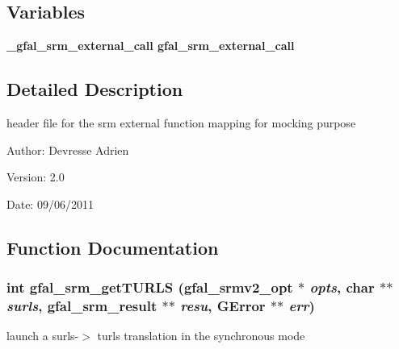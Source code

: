\subsection*{Variables}
\begin{CompactItemize}
\item 
\bf{\_\-gfal\_\-srm\_\-external\_\-call} \textbf{gfal\_\-srm\_\-external\_\-call}\label{gfal__common__srm__internal__layer_8h_67b12c7342043451fc5ce31b1a3d74fb}

\end{CompactItemize}


\subsection{Detailed Description}
header file for the srm external function mapping for mocking purpose 

\begin{Desc}
\item[Author:]Devresse Adrien \end{Desc}
\begin{Desc}
\item[Version:]2.0 \end{Desc}
\begin{Desc}
\item[Date:]09/06/2011 \end{Desc}


\subsection{Function Documentation}
\subsubsection{\setlength{\rightskip}{0pt plus 5cm}int gfal\_\-srm\_\-get\-TURLS (gfal\_\-srmv2\_\-opt $\ast$ {\em opts}, char $\ast$$\ast$ {\em surls}, gfal\_\-srm\_\-result $\ast$$\ast$ {\em resu}, GError $\ast$$\ast$ {\em err})}\label{gfal__common__srm__internal__layer_8h_dd4b348aabe59b3580911b0bc0e69b8b}


launch a surls-$>$ turls translation in the synchronous mode 

